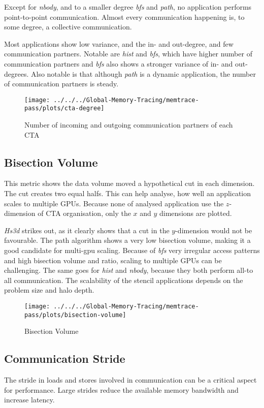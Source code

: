 Except for \textit{nbody}, and to a smaller degree \textit{bfs} and \textit{path}, no application performs point-to-point communication. Almost every communication happening is, to some degree, a collective communication.

Most applications show low variance, and the in- and out-degree, and few communication partners. Notable are \textit{hist} and \textit{bfs}, which have higher number of communication partners and \textit{bfs} also shows a stronger variance of in- and out-degrees. Also notable is that although \textit{path} is a dynamic application, the number of communication partners is steady.

\begin{figure}[t]
	\texttt{[image: ../../../Global-Memory-Tracing/memtrace-pass/plots/cta-degree]}
	\caption{Number of incoming and outgoing communication partners of each CTA}
	\label{fig:Cta-degree}
\end{figure}
\subsection{Bisection Volume}
This metric shows the data volume moved a hypothetical cut in each dimension. The cut creates two equal halfs. This can help analyse, how well an application scales to multiple GPUs. Because none of analysed application use the $z$-dimension of CTA organisation, only the $x$ and $y$ dimensions are plotted. 

\textit{Hs3d} strikes out, as it clearly shows that a cut in the $y$-dimension would not be favourable. The path algorithm shows a very low bisection volume, making it a good candidate for multi-gpu scaling.
Because of \textit{bfs} very irregular access patterns and high bisection volume and ratio, scaling to multiple GPUs can be challenging. The same goes for \textit{hist} and \textit{nbody}, because they both
perform all-to all communication. The scalability of the stencil applications depends on the problem size and halo depth.
\begin{figure}[h!]
	\centering
	\texttt{[image: ../../../Global-Memory-Tracing/memtrace-pass/plots/bisection-volume]}
	\caption{Bisection Volume}
	\label{bisection-vols}
\end{figure}
\subsection{Communication Stride}
The stride in loads and stores involved in communication can be a critical aspect for performance. Large strides reduce the available memory bandwidth and increase latency.

